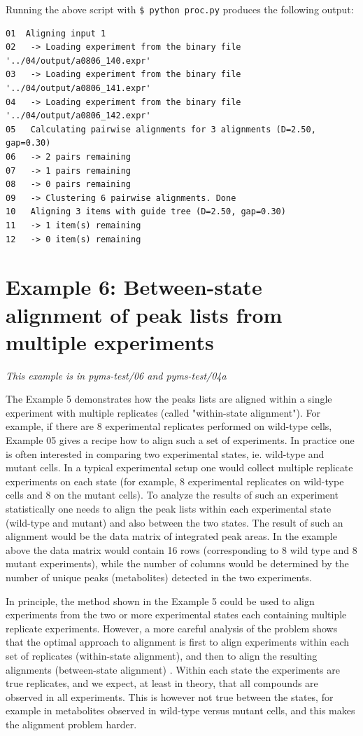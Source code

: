 Running the above script with {\tt \$ python proc.py} produces the
following output:

\begin{verbatim}
01  Aligning input 1
02   -> Loading experiment from the binary file '../04/output/a0806_140.expr'
03   -> Loading experiment from the binary file '../04/output/a0806_141.expr'
04   -> Loading experiment from the binary file '../04/output/a0806_142.expr'
05   Calculating pairwise alignments for 3 alignments (D=2.50, gap=0.30)
06   -> 2 pairs remaining
07   -> 1 pairs remaining
08   -> 0 pairs remaining
09   -> Clustering 6 pairwise alignments. Done
10   Aligning 3 items with guide tree (D=2.50, gap=0.30)
11   -> 1 item(s) remaining
12   -> 0 item(s) remaining
\end{verbatim}

\section{Example 6: Between-state alignment of peak lists from multiple
experiments}

\noindent
{\em This example is in pyms-test/06 and pyms-test/04a}

The Example 5 demonstrates how the peaks lists are aligned within a single
experiment with multiple replicates (called "within-state alignment"). For
example, if there are 8 experimental replicates performed on wild-type
cells, Example 05 gives a recipe how to align such a set of experiments.
In practice one is often interested in comparing two experimental states,
ie. wild-type and mutant cells. In a typical experimental setup one would
collect multiple replicate experiments on each state (for example, 8
experimental replicates on wild-type cells and 8 on the mutant cells).
To analyze the results of such an experiment statistically one needs
to align the peak lists within each experimental state (wild-type and
mutant) and also between the two states. The result of such an alignment
would be the data matrix of integrated peak areas. In the example above
the data matrix would contain 16 rows (corresponding to 8 wild type and
8 mutant experiments), while the number of columns would be determined by
the number of unique peaks (metabolites) detected in the two experiments.

In principle, the method shown in the Example 5 could be used to align
experiments from the two or more experimental states each containing
multiple replicate experiments.  However, a more careful analysis of
the problem shows that the optimal approach to alignment is first
to align experiments within each set of replicates (within-state
alignment), and then to align the resulting alignments (between-state
alignment) \cite{Robinson07}. Within each state the experiments are
true replicates, and we expect, at least in theory, that all compounds
are observed in all experiments.  This is however not true between
the states,  for example in metabolites observed in wild-type versus
mutant cells, and this makes the alignment problem harder.

